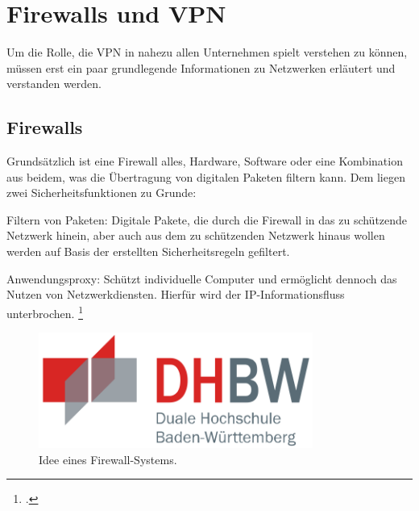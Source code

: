 \chapter{Firewalls und VPN} %
\label{cha:Firewalls und VPN}

Um die Rolle, die VPN in nahezu allen Unternehmen spielt verstehen zu können, müssen erst ein paar grundlegende Informationen zu Netzwerken erläutert und verstanden werden.

\section{Firewalls} %
\label{sec:Firewalls}

Grundsätzlich ist eine Firewall alles, Hardware, Software oder eine Kombination aus beidem, was die Übertragung von digitalen Paketen filtern kann. Dem liegen zwei Sicherheitsfunktionen zu Grunde:

\begin{description}
  \item Filtern von Paketen: Digitale Pakete, die durch die Firewall in das zu schützende Netzwerk hinein, aber auch aus dem zu schützenden Netzwerk hinaus wollen werden auf Basis der erstellten Sicherheitsregeln gefiltert. 
  \item Anwendungsproxy: Schützt individuelle Computer und ermöglicht dennoch das Nutzen von Netzwerkdiensten. Hierfür wird der IP-Informationsfluss unterbrochen. \footcite[Vgl.][S. 99]{WHITMAN.2018}
\end{description}

\begin{figure}[htb]
  \centering
  \includegraphics[width=9cm]{graphics/dhbw.png}
  \caption[Idee eines Firewall-Systems]{Idee eines Firewall-Systems. \footnotemark}
  \label{abb:Firewall}
\end{figure}

